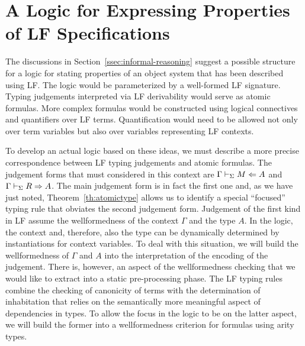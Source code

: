 \section{A Logic for Expressing Properties of LF Specifications}
\label{sec:logic}

The discussions in Section~\ref{ssec:informal-reasoning} suggest a 
possible structure for a logic for stating properties of an object
system that has been described using LF. 
%
The logic would be parameterized by a well-formed LF signature.
%
Typing judgements interpreted via LF derivability would serve as 
atomic formulas.
%
More complex formulas would be constructed using 
logical connectives and quantifiers over LF terms.
%
Quantification would need to be allowed not only over term variables
but also over variables representing LF contexts. 

To develop an actual logic based on these ideas, we must describe a
more precise correspondence between LF typing judgements and atomic
formulas. 
%
The judgement forms that must considered in this context 
are $\Gamma \vdash_{\Sigma} M\Leftarrow A$ and $\Gamma \vdash_{\Sigma} R\Rightarrow A$.
%
The main judgement form is in fact the first one and, as we have just
noted, Theorem~\ref{th:atomictype} allows us to identify a special
``focused'' typing rule that obviates the second judgement form. 
%
Judgement of the first kind in LF assume the wellformedness of the
context $\Gamma$ and the type $A$.
%
In the logic, the context and, therefore, also the type can be
dynamically determined by instantiations for context variables.
%
To deal with this situation, we will build the wellformedness of
$\Gamma$ and $A$ into the interpretation of the encoding of the
judgement. 
%
There is, however, an aspect of the wellformedness checking that we
would like to extract into a static pre-processing phase.
%
The LF typing rules combine the checking of canonicity of terms with
the determination of inhabitation that relies on the semantically more
meaningful aspect of dependencies in types.
%
To allow the focus in the logic to be on the latter aspect, we will
build the former into a wellformedness criterion for formulas using
arity types.


